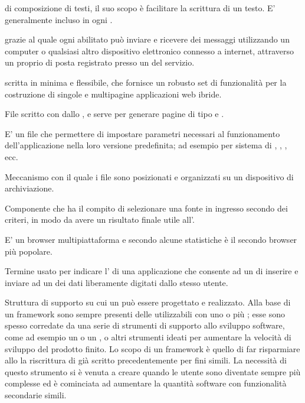 

{ di composizione di testi, il suo scopo è facilitare la scrittura di un testo. E' generalmente incluso in ogni .}


{  grazie al quale ogni  abilitato può inviare e ricevere dei messaggi utilizzando un computer o qualsiasi altro dispositivo elettronico connesso a internet, attraverso un proprio  di posta registrato presso un  del servizio.}


{ scritta in  minima e flessibile, che fornisce un robusto set di funzionalità per la costruzione di singole e multipagine applicazioni web ibride.}



{File scritto con   dallo , e serve per generare pagine di tipo  e .}


{E' un file che permettere di impostare parametri necessari al funzionamento dell'applicazione nella loro versione predefinita; ad esempio  per sistema di , , , ecc.}


{Meccanismo con il quale i file sono posizionati e organizzati su un dispositivo di archiviazione.}


{Componente che ha il compito di selezionare una fonte in ingresso secondo dei criteri, in modo da avere un risultato finale utile all'.}


{E' un browser  multipiattaforma e secondo alcune statistiche è il secondo browser più popolare.}


{Termine usato per indicare l' di una applicazione che consente ad un  di inserire e inviare ad un  dei dati liberamente digitati dallo stesso utente.}


{Struttura di supporto su cui un  può essere progettato e realizzato. Alla base di un framework sono sempre presenti delle  utilizzabili con uno o più ; esse sono spesso corredate da una serie di strumenti di supporto allo sviluppo software, come ad esempio un  o un , o altri strumenti ideati per aumentare la velocità di sviluppo del prodotto finito.
Lo scopo di un framework è quello di far risparmiare allo  la riscrittura di  già scritto precedentemente per fini simili. La necessità di questo strumento si è venuta a creare quando le  utente sono diventate sempre più complesse ed è cominciata ad aumentare la quantità software con funzionalità secondarie simili.}


